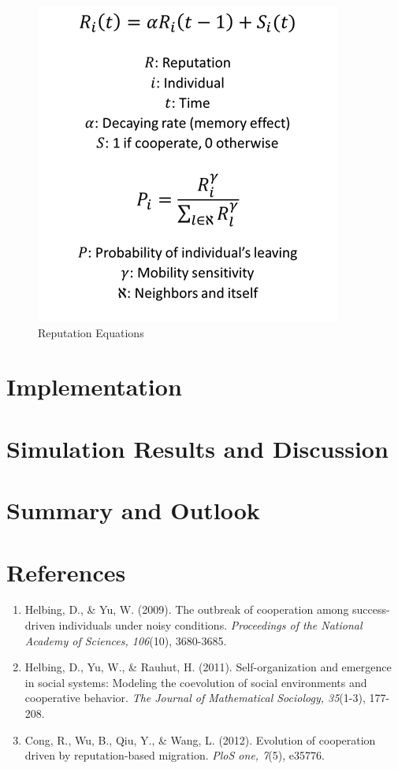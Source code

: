 \documentclass[11pt]{article}
\begin{document}
\begin{figure}[!htbp]
	\centering
	\includegraphics[scale=0.75]{../../other/reputation_eq.png}
    \caption{Reputation Equations}
    \label{fig:reputationeq}
\end{figure}

\section{Implementation}

\section{Simulation Results and Discussion}

\section{Summary and Outlook}

\section{References}

\begin{enumerate}
\item Helbing, D., \& Yu, W. (2009). The outbreak of cooperation among success-driven individuals under noisy conditions. \textit{Proceedings of the National Academy of Sciences, 106}(10), 3680-3685.
\item Helbing, D., Yu, W., \& Rauhut, H. (2011). Self-organization and emergence in social systems: Modeling the coevolution of social environments and cooperative behavior. \textit{The Journal of Mathematical Sociology, 35}(1-3), 177-208.
\item Cong, R., Wu, B., Qiu, Y., \& Wang, L. (2012). Evolution of cooperation driven by reputation-based migration. \textit{PloS one, 7}(5), e35776.
\end{enumerate}
\end{document}
